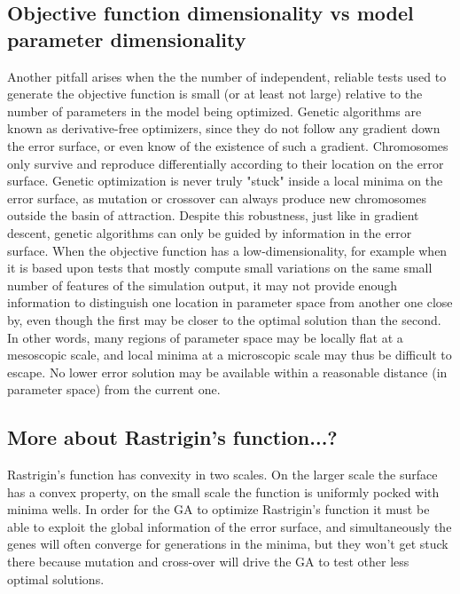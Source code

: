 \subsection{Objective function dimensionality vs model parameter dimensionality}    
Another pitfall arises when the the number of independent, reliable tests used to generate the objective function is small (or at least not large) relative to the number of parameters in the model being optimized.
Genetic algorithms are known as derivative-free optimizers, since they do not follow any gradient down the error surface, or even know of the existence of such a gradient.
Chromosomes only survive and reproduce differentially according to their location on the error surface.
Genetic optimization is never truly "stuck" inside a local minima on the error surface, as mutation or crossover can always produce new chromosomes outside the basin of attraction. Despite this robustness, just like in gradient descent, genetic algorithms can only be guided by information in the error surface.
When the objective function has a low-dimensionality, for example when it is based upon tests that mostly compute small variations on the same small number of features of the simulation output, it may not provide enough information to distinguish one location in parameter space from another one close by, even though the first may be closer to the optimal solution than the second.
In other words, many regions of parameter space may be locally flat at a mesoscopic scale, and local minima at a microscopic scale may thus be difficult to escape.
No lower error solution may be available within a reasonable distance (in parameter space) from the current one.

\subsection{More about Rastrigin's function...?}
Rastrigin's function has convexity in two scales. On the larger scale the surface has a convex property, on the small scale the function is uniformly pocked with minima wells. In order for the GA to optimize Rastrigin's function it must be able to exploit the global information of the error surface, and simultaneously the genes will often converge for generations in the minima, but they won't get stuck there because mutation and cross-over will drive the GA to test other less optimal solutions.\\
\\
   
